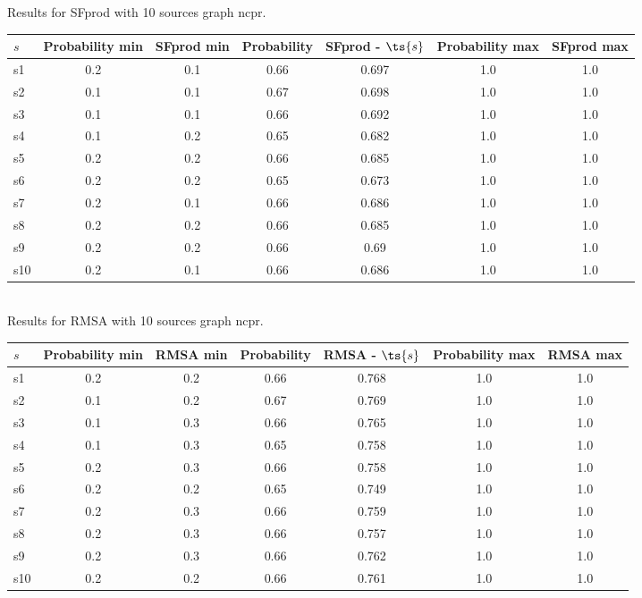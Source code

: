 \documentclass{article}
\begin{document}
\noindent Results for SFprod with 10 sources graph ncpr.

\noindent\begin{tabular}{|l|c|c|c|c|c|c|}
\hline
$s$& Probability min & SFprod min & Probability & SFprod - $\ts{s}$ & Probability max & SFprod max\\
\hline
s1 &0.2 & 0.1 & 0.66 & 0.697 & 1.0 & 1.0\\
\hline
s2 &0.1 & 0.1 & 0.67 & 0.698 & 1.0 & 1.0\\
\hline
s3 &0.1 & 0.1 & 0.66 & 0.692 & 1.0 & 1.0\\
\hline
s4 &0.1 & 0.2 & 0.65 & 0.682 & 1.0 & 1.0\\
\hline
s5 &0.2 & 0.2 & 0.66 & 0.685 & 1.0 & 1.0\\
\hline
s6 &0.2 & 0.2 & 0.65 & 0.673 & 1.0 & 1.0\\
\hline
s7 &0.2 & 0.1 & 0.66 & 0.686 & 1.0 & 1.0\\
\hline
s8 &0.2 & 0.2 & 0.66 & 0.685 & 1.0 & 1.0\\
\hline
s9 &0.2 & 0.2 & 0.66 & 0.69 & 1.0 & 1.0\\
\hline
s10 &0.2 & 0.1 & 0.66 & 0.686 & 1.0 & 1.0\\
\hline
\end{tabular}\\

\noindent Results for RMSA with 10 sources graph ncpr.

\noindent\begin{tabular}{|l|c|c|c|c|c|c|}
\hline
$s$& Probability min & RMSA min & Probability & RMSA - $\ts{s}$ & Probability max & RMSA max\\
\hline
s1 &0.2 & 0.2 & 0.66 & 0.768 & 1.0 & 1.0\\
\hline
s2 &0.1 & 0.2 & 0.67 & 0.769 & 1.0 & 1.0\\
\hline
s3 &0.1 & 0.3 & 0.66 & 0.765 & 1.0 & 1.0\\
\hline
s4 &0.1 & 0.3 & 0.65 & 0.758 & 1.0 & 1.0\\
\hline
s5 &0.2 & 0.3 & 0.66 & 0.758 & 1.0 & 1.0\\
\hline
s6 &0.2 & 0.2 & 0.65 & 0.749 & 1.0 & 1.0\\
\hline
s7 &0.2 & 0.3 & 0.66 & 0.759 & 1.0 & 1.0\\
\hline
s8 &0.2 & 0.3 & 0.66 & 0.757 & 1.0 & 1.0\\
\hline
s9 &0.2 & 0.3 & 0.66 & 0.762 & 1.0 & 1.0\\
\hline
s10 &0.2 & 0.2 & 0.66 & 0.761 & 1.0 & 1.0\\
\hline
\end{tabular}\\
\end{document}
